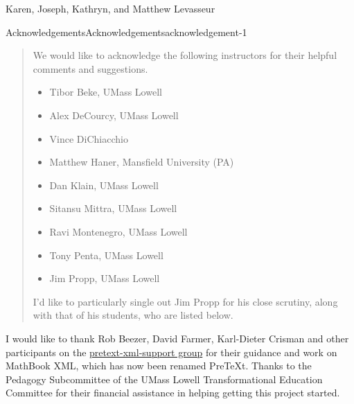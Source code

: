\documentclass[twoside,10pt,]{book}
\numberwithin{equation}{section}
\begin{document}
\begin{center}\Large%
Karen, Joseph, Kathryn, and Matthew Levasseur%
\end{center}
\clearpage
\thispagestyle{empty}
\null%
\clearpage
%
%
\typeout{************************************************}
\typeout{************************************************}
%
\begin{acknowledgement}{Acknowledgements}{}{Acknowledgements}{}{}{acknowledgement-1}
\begin{quote}\hypertarget{blockquote-1}{}
\hypertarget{p-4}{}%
We would like to acknowledge the following instructors for their helpful comments and suggestions.\leavevmode%
\begin{multicols}{2}
\begin{itemize}[label=\textbullet]
\item{}\hypertarget{p-5}{}%
Tibor Beke, UMass Lowell%
\item{}\hypertarget{p-6}{}%
Alex DeCourcy, UMass Lowell%
\item{}\hypertarget{p-7}{}%
Vince DiChiacchio%
\item{}\hypertarget{p-8}{}%
Matthew Haner, Mansfield University (PA)%
\item{}\hypertarget{p-9}{}%
Dan Klain, UMass Lowell%
\item{}\hypertarget{p-10}{}%
Sitansu Mittra, UMass Lowell%
\item{}\hypertarget{p-11}{}%
Ravi Montenegro, UMass Lowell%
\item{}\hypertarget{p-12}{}%
Tony Penta, UMass Lowell%
\item{}\hypertarget{p-13}{}%
Jim Propp, UMass Lowell%
\end{itemize}
\end{multicols}
I'd like to particularly single out Jim Propp for his close scrutiny, along with that of his students, who are listed below.%
\end{quote}
\hypertarget{p-14}{}%
I would like to thank Rob Beezer, David Farmer, Karl-Dieter Crisman and other participants on the \href{https://groups.google.com/forum/m/?fromgroups\#!forum/pretext-support}{pretext-xml-support group} for their guidance and work on MathBook XML, which has now been renamed PreTeXt.  Thanks to the Pedagogy Subcommittee of the UMass Lowell Transformational Education Committee for their financial assistance in helping getting this project started.%

\end{acknowledgement}
\end{document}
